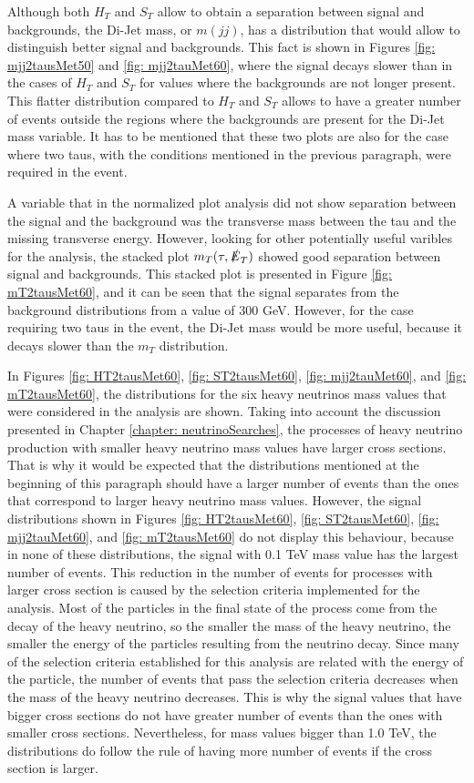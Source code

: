 Although both $H_{T}$ and $S_{T}$ allow to obtain a separation between signal and backgrounds, the Di-Jet mass, or $m(jj)$, has a distribution that would allow to distinguish better signal and backgrounds. This fact is shown in Figures \ref{fig: mjj2tausMet50} and \ref{fig: mjj2tauMet60}, where the signal decays slower than in the cases of $H_{T}$ and $S_{T}$ for values where the backgrounds are not longer present. This flatter distribution compared to $H_{T}$ and $S_{T}$ allows to have a greater number of events outside the regions where the backgrounds are present for the Di-Jet mass variable. It has to be mentioned that these two plots are also for the case where two taus, with the conditions mentioned in the previous paragraph, were required in the event. 

A variable that in the normalized plot analysis did not show separation between the signal and the background was the transverse mass between the tau and the missing transverse energy. However, looking for other potentially useful varibles for the analysis, the stacked plot $m_{T}(\tau, \slashed{E}_{T})$ showed good separation between signal and backgrounds. This stacked plot is presented in Figure \ref{fig: mT2tausMet60}, and it can be seen that the signal separates from the background distributions from a value of 300 GeV. However, for the case requiring two taus in the event, the Di-Jet mass would be more useful, because it decays slower than the $m_{T}$ distribution. 

In Figures \ref{fig: HT2tausMet60}, \ref{fig: ST2tausMet60}, \ref{fig: mjj2tauMet60}, and \ref{fig: mT2tausMet60}, the distributions for the six heavy neutrinos mass values that were considered in the analysis are shown. Taking into account the discussion presented in Chapter \ref{chapter: neutrinoSearches}, the processes of heavy neutrino production with smaller heavy neutrino mass values have larger cross sections. That is why it would be expected that the distributions mentioned at the beginning of this paragraph should have a larger number of events than the ones that correspond to larger heavy neutrino mass values. However, the signal distributions shown in Figures \ref{fig: HT2tausMet60}, \ref{fig: ST2tausMet60}, \ref{fig: mjj2tauMet60}, and \ref{fig: mT2tausMet60} do not display this behaviour, because in none of these distributions, the signal with 0.1 TeV mass value has the largest number of events. This reduction in the number of events for processes with larger cross section is caused by the selection criteria implemented for the analysis. Most of the particles in the final state of the process come from the decay of the heavy neutrino, so the smaller the mass of the heavy neutrino, the smaller the energy of the particles resulting from the neutrino decay. Since many of the selection criteria established for this analysis are related with the energy of the particle, the number of events that pass the selection criteria decreases when the mass of the heavy neutrino decreases. This is why the signal values that have bigger cross sections do not have greater number of events than the ones with smaller cross sections. Nevertheless, for mass values bigger than 1.0 TeV, the distributions do follow the rule of having more number of events if the cross section is larger. 

